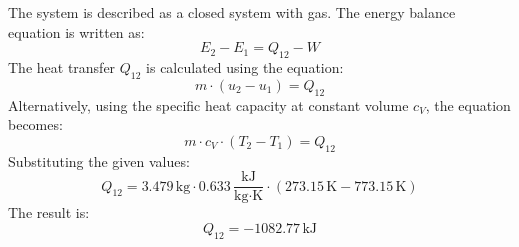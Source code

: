 The system is described as a closed system with gas. The energy balance equation is written as:  
\[
E_2 - E_1 = Q_{12} - W
\]  
The heat transfer \( Q_{12} \) is calculated using the equation:  
\[
m \cdot (u_2 - u_1) = Q_{12}
\]  
Alternatively, using the specific heat capacity at constant volume \( c_V \), the equation becomes:  
\[
m \cdot c_V \cdot (T_2 - T_1) = Q_{12}
\]  
Substituting the given values:  
\[
Q_{12} = 3.479 \, \text{kg} \cdot 0.633 \, \frac{\text{kJ}}{\text{kg·K}} \cdot (273.15 \, \text{K} - 773.15 \, \text{K})
\]  
The result is:  
\[
Q_{12} = -1082.77 \, \text{kJ}
\]